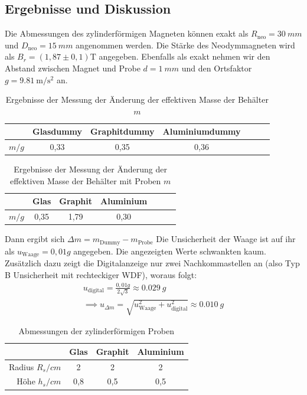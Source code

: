 \documentclass[
	a4paper,
	12pt,
	pagesize,
	ngerman
]{scrartcl}
\begin{document}
	\subsection{Ergebnisse und Diskussion}
	Die Abmessungen des zylinderförmigen Magneten können exakt als $R_\text{neo}= \SI{30}{mm}$ und $D_\text{neo}=\SI{15}{mm}$ angenommen werden. Die Stärke des Neodymmagneten wird als $B_r = (1,87 \pm 0,1 ) \si{\tesla}$ angegeben. Ebenfalls als exakt nehmen wir den Abstand zwischen Magnet und Probe $d= \SI{1}{mm}$ und den Ortsfaktor $g=\SI{9,81}{\meter \per \second \squared}$ an. 
	\newline
	\begin{table}[h]
	\centering
	\begin{tabular}{ r | c | c | c | c | c | c}
		 & Glasdummy & Graphitdummy & Aluminiumdummy\\ \hline
		$m  \si{/g}$ &0,33 & 0,35 & 0,36\\
	\end{tabular}
	\caption{Ergebnisse der Messung der Änderung der effektiven Masse der Behälter $m$}
	\end{table}
\newline %
	\begin{table}[h]
	\centering
	\begin{tabular}{ r | c | c | c | c | c | c}
		 & Glas & Graphit & Aluminium \\ \hline
		$m  \si{/g}$ & 0,35 &1,79 & 0,30 \\
	\end{tabular}
	\caption{Ergebnisse der Messung der Änderung der effektiven Masse der Behälter mit Proben $m$}
	\end{table}
	Dann ergibt sich $\Delta m = m_{\text{Dummy}} - m_{\text{Probe}}$ \newline
	Die Unsicherheit der Waage ist auf ihr als $u_\text{Waage}=0,01 \si{g}$ angegeben. Die angezeigten Werte schwankten kaum. Zusätzlich dazu zeigt die Digitalanzeige nur zwei Nachkommastellen an (also Typ B Unsicherheit mit rechteckiger WDF), woraus folgt:  \\
	\begin{gather*}
		u_\text{digital}=\frac{0,01 \si{g}}{2\sqrt{3}} \approx \SI{0,029}{g} \\
		\implies u_{\Delta m}= \sqrt{u_\text{Waage}^2 + u_\text{digital}^2}  \approx \SI{0,010}{g} 
	\end{gather*}
	\begin{table}[h]
	\centering
	\begin{tabular}{ r | c | c | c}
		& Glas & Graphit & Aluminium \\ \hline
		Radius $R_s \si{/cm}$ & 2 & 2 & 2\\
		Höhe $h_s \si{/cm}$ & 0,8 & 0,5 & 0,5\\
	\end{tabular} \newline
	\caption{Abmessungen der zylinderförmigen Proben}
	\end{table}
\end{document}
